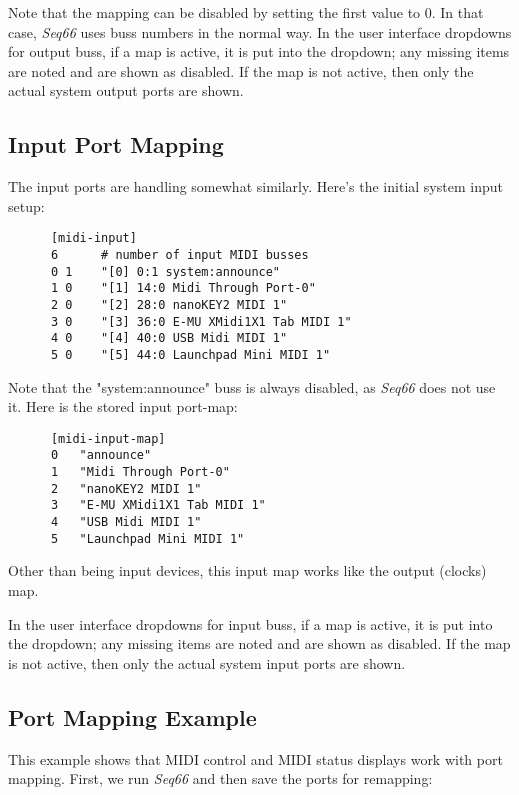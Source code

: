   Note that the mapping can be disabled by setting the first value to 0.  In
   that case, \textsl{Seq66} uses buss numbers in the normal way.
   In the user interface dropdowns for output buss, if a map is active, it is
   put into the dropdown; any missing items are noted and are shown as
   disabled.
   If the map is not active, then only the actual system output ports are shown.

\subsection{Input Port Mapping}
\label{subsec:input_port_mapping}

   The input ports are handling somewhat similarly.  Here's the initial system
   input setup:

   \begin{verbatim}
      [midi-input]
      6      # number of input MIDI busses
      0 1    "[0] 0:1 system:announce"
      1 0    "[1] 14:0 Midi Through Port-0"
      2 0    "[2] 28:0 nanoKEY2 MIDI 1"
      3 0    "[3] 36:0 E-MU XMidi1X1 Tab MIDI 1"
      4 0    "[4] 40:0 USB Midi MIDI 1"
      5 0    "[5] 44:0 Launchpad Mini MIDI 1"
   \end{verbatim}

   Note that the "system:announce" buss is always disabled, as \textsl{Seq66}
   does not use it.  Here is the stored input port-map:

   \begin{verbatim}
      [midi-input-map]
      0   "announce"
      1   "Midi Through Port-0"
      2   "nanoKEY2 MIDI 1"
      3   "E-MU XMidi1X1 Tab MIDI 1"
      4   "USB Midi MIDI 1"
      5   "Launchpad Mini MIDI 1"
   \end{verbatim}

   Other than being input devices, this input map works like the output
   (clocks) map.

   In the user interface dropdowns for input buss, if a map is active, it is
   put into the dropdown; any missing items are noted and are shown as
   disabled.
   If the map is not active, then only the actual system input ports are shown.

\subsection{Port Mapping Example}
\label{subsec:input_port_mapping_example}

   This example shows that MIDI control and MIDI status displays work with
   port mapping.  First, we run \textsl{Seq66} and then save the ports for
   remapping:

